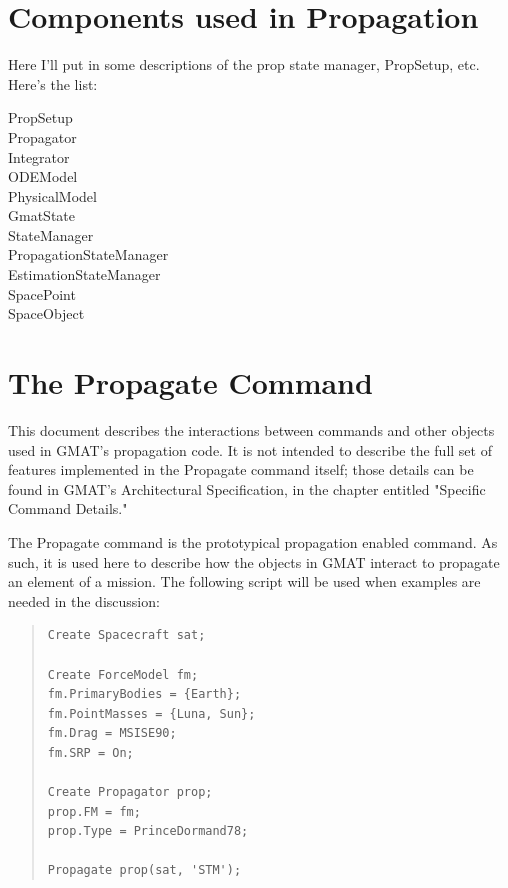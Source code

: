 \documentclass[11pt]{article}
\begin{document}
\section{Components used in Propagation}

Here I'll put in some descriptions of the prop state manager, PropSetup, etc.  Here's the list:

\begin{description}
\item[PropSetup ]
\item[Propagator]
\item[Integrator]
\item[ODEModel]
\item[PhysicalModel]
\item[GmatState]
\item[StateManager]
\item[PropagationStateManager]
\item[EstimationStateManager]
\item[SpacePoint]
\item[SpaceObject]
\end{description}

\section{The Propagate Command}

This document describes the interactions between commands and other objects used in GMAT's propagation code.  It is not intended to describe the full set of features implemented in the Propagate command itself; those details can be found in GMAT's Architectural Specification\cite{GMAT:2008}, in the chapter entitled "Specific Command Details."  

The Propagate command is the prototypical propagation enabled command.  As such, it is used here to describe how the objects in GMAT interact to propagate an element of a mission.  The following script will be used when examples are needed in the discussion:

\begin{quote}
\begin{verbatim}
Create Spacecraft sat;

Create ForceModel fm;
fm.PrimaryBodies = {Earth};
fm.PointMasses = {Luna, Sun};
fm.Drag = MSISE90;
fm.SRP = On;

Create Propagator prop;
prop.FM = fm;
prop.Type = PrinceDormand78;

Propagate prop(sat, 'STM');
\end{verbatim}
\end{quote}
\end{document}
